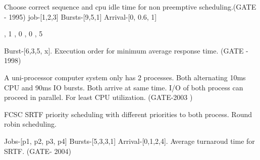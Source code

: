   \begin{choices}
  \end{choices}

  \question  Choose correct sequence and cpu idle time for non preemptive scheduling.(GATE - 1995)
             \newline job-[1,2,3] Bursts-[9,5,1] Arrival-[0, 0.6, 1]
  \begin{choices}
    , 1
    , 0
    , 0
    , 5
  \end{choices}

  \question  Burst-[6,3,5, x]. Execution order for minimum average response time. (GATE - 1998)

  \question  A uni-processor computer system only has 2 processes. Both alternating 10ms CPU and 90ms IO bursts.
             Both arrive at same time. I/O of both process can proceed in parallel. For least CPU utilization. (GATE-2003 )

  \begin{choices}
    \choice FCSC
    \choice SRTF
    \choice priority scheduling with different priorities to both process.
    \choice Round robin scheduling.
  \end{choices}

  \question  Jobs-[p1, p2, p3, p4] Bursts-[5,3,3,1] Arrival-[0,1,2,4]. Average turnaroud time for SRTF. (GATE- 2004)

  \begin{oneparchoices}
  \end{oneparchoices}

\begin{comment}

\begin{minipage}{\linewidth}

  \question  (GATE- )

  \begin{choices}
    \choice
    \choice
    \choice
    \choice
  \end{choices}

\end{minipage}


\end{comment}
